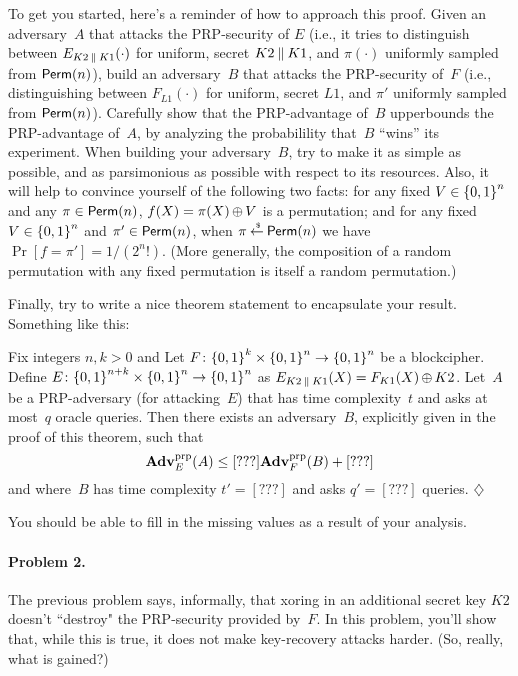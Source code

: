 \documentclass[11pt]{article}
\newcommand{\Prob}[1]{\Pr\left[#1\right]}
\newcommand{\AdvPRP}[2]{\Adv^{\mathrm{prp}}_{#1}(#2)}
\begin{document}
To get you started, here's a reminder of how to approach this
proof. Given an adversary~$A$ that attacks the PRP-security of
$E$ (i.e., it tries to distinguish between $E_{K2 \:\|\: K1}(\cdot)$ for uniform, secret $K2 \:\|\: K1$, and $\pi(\cdot)$ uniformly sampled from $\mathsf{Perm}({n})$), build an adversary~$B$ that attacks the PRP-security
of~$F$ (i.e., distinguishing between $F_{L1}(\cdot)$ for uniform, secret $L1$, and $\pi'$ uniformly sampled from $\mathsf{Perm}({n})$). Carefully show that the PRP-advantage of~$B$ upperbounds the
PRP-advantage of~$A$, by analyzing the probabilility that~$B$ ``wins''
its experiment.  When building your adversary~$B$, try to make it as
simple as possible, and as parsimonious as possible with respect to
its resources.  Also, it will help to convince yourself of the following two facts: for any fixed $V \in {\{0,1\}}^n$ and any $\pi \in \mathsf{Perm}({n})$, $f(X)=\pi(X) {\,\oplus\,} V$ is a permutation; and for any fixed $V \in {\{0,1\}}^n$ and $\pi'\in \mathsf{Perm}({n})$, when $\pi {\:\stackrel{{\scriptscriptstyle \hspace{0.2em}\$}} {\leftarrow}\:} \mathsf{Perm}({n})$ we have $\Prob{f=\pi'}=1/(2^n!)$.  (More generally, the composition of a random permutation with any fixed permutation is itself a random permutation.)

Finally, try to write a nice theorem statement to encapsulate your result. Something like this:
\begin{theorem}  Fix integers $n,k>0$ and Let $F\colon{\{0,1\}}^k \times {\{0,1\}}^n \to {\{0,1\}}^n$ be a blockcipher.  Define $E\colon {\{0,1\}}^{n+k} \times {\{0,1\}}^n \to {\{0,1\}}^n$ as $E_{K2 \:\|\: K1}(X) = F_{K1}(X) {\,\oplus\,} K2$.  Let~$A$ be a PRP-adversary (for attacking~$E$) that has time complexity~$t$ and asks at most~$q$ oracle queries.  Then there exists an adversary~$B$, explicitly given in the proof of this theorem, such that
  \[
     \AdvPRP{E}{A} \leq [\textrm{???}]\AdvPRP{F}{B} + [\textrm{???}]
  \]
and where~$B$ has time complexity $t'=[\textrm{???}]$ and asks $q'=[\textrm{???}]$ queries. \hfill$\diamondsuit$
\end{theorem}

\noindent You should be able to fill in the missing values as a result of your analysis.

\paragraph{Problem 2.} The previous problem says, informally, that xoring in an additional secret key $K2$ doesn't ``destroy" the PRP-security provided by~$F$.  In this problem, you'll show that, while this is true, it does not make key-recovery attacks harder. (So, really, what is gained?)
\end{document}

